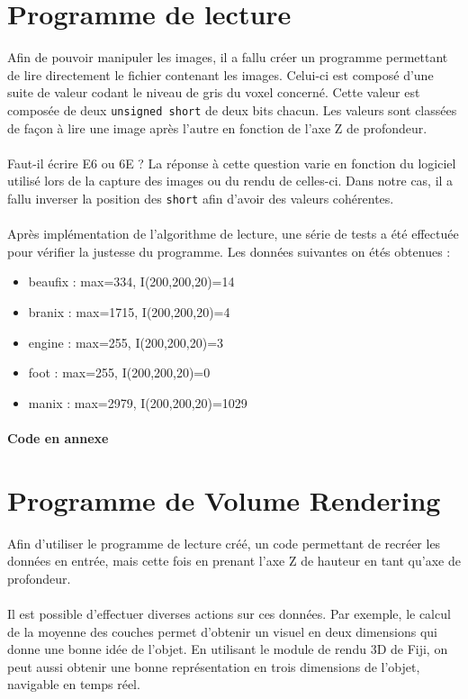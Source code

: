 \documentclass[a4paper,11pt]{article}
\begin{document}
\newpage 
\section{Programme de lecture}
Afin de pouvoir manipuler les images, il a fallu créer un programme permettant de lire directement le fichier contenant les images. Celui-ci est composé d'une suite de valeur codant le niveau de gris du voxel concerné. Cette valeur est composée de deux \texttt{unsigned short} de deux bits chacun. Les valeurs sont classées de façon à lire une image après l'autre en fonction de l'axe Z de profondeur. 
\paragraph{} Faut-il écrire E6 ou 6E ? La réponse à cette question varie en fonction du logiciel utilisé lors de la capture des images ou du rendu de celles-ci. Dans notre cas, il a fallu inverser la position des \texttt{short} afin d'avoir des valeurs cohérentes.
\paragraph{} Après implémentation de l'algorithme de lecture, une série de tests a été effectuée pour vérifier la justesse du programme. Les données suivantes on étés obtenues : 
\begin{itemize}
\item  beaufix : max=334, I(200,200,20)=14
\item  branix : max=1715, I(200,200,20)=4
\item  engine : max=255, I(200,200,20)=3
\item  foot : max=255, I(200,200,20)=0
\item  manix : max=2979, I(200,200,20)=1029
\end{itemize}

\paragraph{Code en annexe}

\section{Programme de Volume Rendering}
Afin d'utiliser le programme de lecture créé, un code permettant de recréer les données en entrée, mais cette fois en prenant l'axe Z de hauteur en tant qu'axe de profondeur.
\paragraph{} Il est possible d'effectuer diverses actions sur ces données. Par exemple, le calcul de la moyenne des couches permet d'obtenir un visuel en deux dimensions qui donne une bonne idée de l'objet. En utilisant le module de rendu 3D de Fiji, on peut aussi obtenir une bonne représentation en trois dimensions de l'objet, navigable en temps réel.
\end{document}
